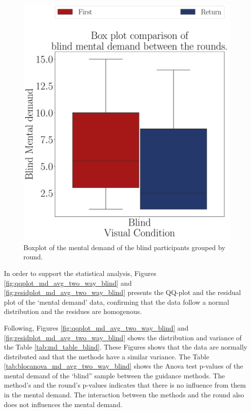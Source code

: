 \begin{figure}[!htb]
    \begin{minipage}{0.075\textwidth}
        \hfill
    \end{minipage}
    \begin{minipage}{0.45\textwidth}
        \centering
        \includegraphics[width = \textwidth]{Resultados/Nasa/Figuras/pdf/boxplot_md_blind_rounds.pdf}
        \caption{Boxplot of the mental demand of the blind participants grouped by round.}
        \label{fig:boxplot_md_blind_rounds}
    \end{minipage}
\end{figure}

In order to support the statistical analysis, Figures \ref{fig:qqplot_md_avg_two_way_blind} and \ref{fig:residplot_md_avg_two_way_blind} presents the QQ-plot and the residual plot of the ‘mental demand’ data, confirming that the data follow a normal distribution and the residues are homogenous.

Following, Figures \ref{fig:qqplot_md_avg_two_way_blind} and \ref{fig:residplot_md_avg_two_way_blind} shows the distribution and variance of the Table \ref{tab:md_table_blind}. These Figures shows that the data are normally distributed and that the methods have a similar variance. The Table \ref{tab:blocanova_md_avg_two_way_blind} shows the Anova test p-values of the mental demand of the ‘blind” sample between the guidance methods. The method’s and the round’s p-values indicates that there is no influence from them in the mental demand. The interaction between the methods and the round also does not influences the mental demand.

